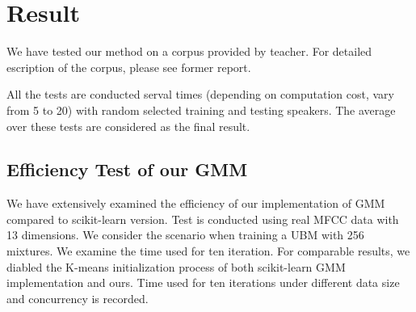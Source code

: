 \section{Result}
\label{sec:result}
We have tested our method on a corpus provided by teacher. For detailed
escription of the corpus, please see former report.

All the tests are conducted serval times (depending on computation cost,
vary from 5 to 20) with random selected training and testing speakers.
The average over these tests are considered as the final
result.

\subsection{Efficiency Test of our GMM}
We have extensively examined the efficiency of our implementation of GMM
compared to scikit-learn version. Test is conducted using real MFCC data with
13 dimensions. We consider the scenario when training a UBM with 256 mixtures.
We examine the time used for ten iteration.  For comparable results, we diabled
the K-means initialization process of both scikit-learn GMM implementation and
ours.  Time used for ten iterations under different data size and concurrency
is recorded.

